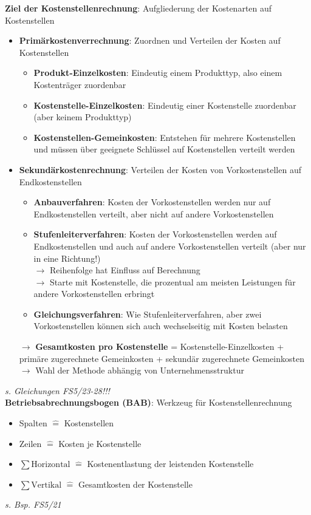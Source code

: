 \textbf{Ziel der Kostenstellenrechnung}: Aufgliederung der Kostenarten auf Kostenstellen
\begin{itemize}
	\item \textbf{Primärkostenverrechnung}: Zuordnen und Verteilen der Kosten auf Kostenstellen
	\begin{itemize}
		\item \textbf{Produkt-Einzelkosten}: Eindeutig einem Produkttyp, also einem Kostenträger zuordenbar
		\item \textbf{Kostenstelle-Einzelkosten}: Eindeutig einer Kostenstelle zuordenbar (aber keinem Produkttyp)
		\item \textbf{Kostenstellen-Gemeinkosten}: Entstehen für mehrere Kostenstellen und müssen über geeignete Schlüssel auf Kostenstellen verteilt werden
	\end{itemize}
	\item \textbf{Sekundärkostenrechnung}: Verteilen der Kosten von Vorkostenstellen auf Endkostenstellen
	\begin{itemize}
		\item \textbf{Anbauverfahren}: Kosten der Vorkostenstellen werden nur auf Endkostenstellen verteilt, aber nicht auf andere Vorkostenstellen
		\item \textbf{Stufenleiterverfahren}: Kosten der Vorkostenstellen werden auf Endkostenstellen und auch auf andere Vorkostenstellen verteilt (aber nur in eine Richtung!)\\
		$\rightarrow$ Reihenfolge hat Einfluss auf Berechnung\\
		$\rightarrow$ Starte mit Kostenstelle, die prozentual am meisten Leistungen für andere Vorkostenstellen erbringt
		\item \textbf{Gleichungsverfahren}: Wie Stufenleiterverfahren, aber zwei Vorkostenstellen können sich auch wechselseitig mit Kosten belasten
	\end{itemize}
	$\rightarrow$ \textbf{Gesamtkosten pro Kostenstelle} = Kostenstelle-Einzelkosten + primäre zugerechnete Gemeinkosten + sekundär zugerechnete Gemeinkosten\\
	$\rightarrow$ Wahl der Methode abhängig von Unternehmensstruktur
\end{itemize}
\textit{s. Gleichungen FS5/23-28!!!}\\

\textbf{Betriebsabrechnungsbogen (BAB)}: Werkzeug für Kostenstellenrechnung
\begin{itemize}
	\item Spalten $\widehat{=}$ Kostenstellen
	\item Zeilen $\widehat{=}$ Kosten je Kostenstelle
	\item $\sum\text{Horizontal }\widehat{=}$ Kostenentlastung der leistenden Kostenstelle
	\item $\sum\text{Vertikal }\widehat{=}$ Gesamtkosten der Kostenstelle
\end{itemize}
\textit{s. Bsp. FS5/21}

